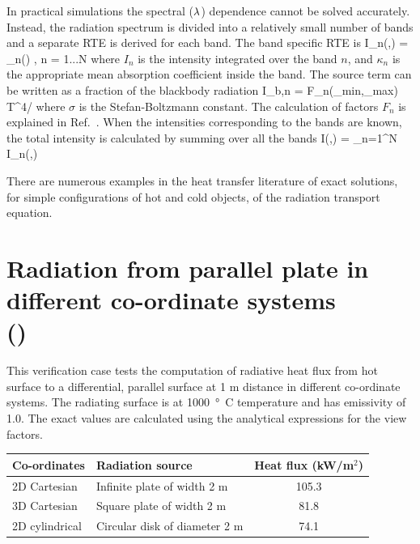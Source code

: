 \documentclass[11pt]{book}
\begin{document}
In practical simulations the spectral ($\lambda$) dependence cannot be solved
accurately. Instead, the radiation spectrum is divided into
a relatively small number of bands and a separate RTE is derived for
each band. The band specific RTE is
\be   \bs \cdot \nabla I_n(\bx,\bs) = \kappa_n(\bx) \;
        \left[ I_{b,n}(\bx) - I_n(\bx,\bs) \right],\;\; n = 1...N
\label{bandRTE} \ee
where $I_n$ is the intensity integrated over the band $n$, and $\kappa_n$
is the appropriate mean absorption coefficient inside the band. The
source term can be written as a fraction of the blackbody radiation
\be I_{b,n} = F_n(\la_{\rm min},\la_{\rm max}) \; \sigma \; T^4/\pi \ee
where $\sigma$ is the Stefan-Boltzmann constant.
The calculation of factors $F_n$ is explained in Ref.~\cite{Siegel:1}.
When the intensities corresponding to the bands are known, the total
intensity is calculated by summing over all the bands
\be I(\bx,\bs) = \sum_{n=1}^N I_n(\bx,\bs) \ee

There are numerous examples in the heat transfer literature of exact solutions, for simple configurations of hot and cold objects, of the radiation
transport equation.

\clearpage

\section{Radiation from parallel plate in different co-ordinate systems \\
(\texorpdfstring{}{plate\_view\_factor}) }
\label{plate_view_factor}


This verification case tests the computation of radiative heat flux from hot surface to a differential, parallel surface at 1 m distance
in different co-ordinate systems. The radiating surface is at 1000~\si{\degree C} temperature and has emissivity of 1.0.  The exact values are
calculated using the analytical expressions for the view factors.
\begin{center}
\begin{tabular}{|l|l|c|}
\hline Co-ordinates & Radiation source & Heat flux (kW/m$^2$)  \\ \hline \hline
2D Cartesian   & Infinite plate of width 2 m   & 105.3 \\
3D Cartesian   & Square plate of width 2 m     & 81.8 \\
2D cylindrical & Circular disk of diameter 2 m & 74.1 \\ \hline
\end{tabular}
\end{center}
\end{document}
